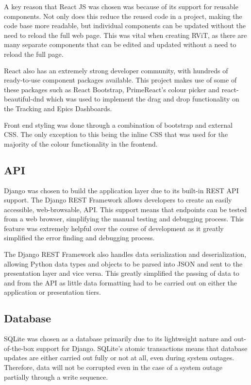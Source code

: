 \documentclass[l4proj.tex]{subfiles}
\begin{document}
A key reason that React JS was chosen was because of its support for reusable components. Not only does this reduce the reused code in a project, making the code base more readable, but individual components can be updated without the need to reload the full web page. This was vital when creating RViT, as there are many separate components that can be edited and updated without a need to reload the full page. 

React also has an extremely strong developer community, with hundreds of ready-to-use component packages available. This project makes use of some of these packages such as React Bootstrap, PrimeReact's colour picker and react-beautiful-dnd which was used to implement the drag and drop functionality on the Tracking and Epics Dashboards.

Front end styling was done through a combination of bootstrap and external CSS. The only exception to this being the inline CSS that was used for the majority of the colour functionality in the frontend.

\subsection{API}
Django was chosen to build the application layer due to its built-in REST API support. The Django REST Framework allows developers to create an easily accessible, web-browsable, API. This support means that endpoints can be tested from a web browser, simplifying the manual testing and debugging process. This feature was extremely helpful over the course of development as it greatly simplified the error finding and debugging process. 

The Django REST Framework also handles data serialization and deserialization, allowing Python data types and objects to be parsed into JSON and sent to the presentation layer and vice versa. This greatly simplified the passing of data to and from the API as little data formatting had to be carried out on either the application or presentation tiers. 


\subsection{Database}
SQLite was chosen as a database primarily due to its lightweight nature and out-of-the-box support for Django. SQLite's atomic transactions means that database updates are either carried out fully or not at all, even during system outages. Therefore, data will not be corrupted even in the case of a system outage partially through a write sequence.
\end{document}
